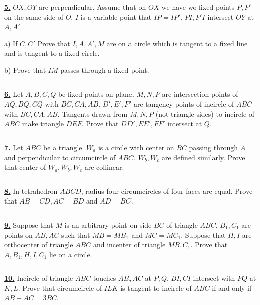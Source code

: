 \documentclass{article}
\newcommand{\equal}{=}
\begin{document}
$$ $$

$$ $$

\href{http://www.artofproblemsolving.com/Forum/viewtopic.php?p=1385942#p1385942}{\bf 5.} $ OX,OY$ are perpendicular. Assume that on $ OX$  we have wo fixed points $ P,P'$ on the same side of $ O$. $ I$ is a variable point that $ IP\equal{}IP'$. $ PI,P'I$ intersect $ OY$ at $ A,A'$.

\par a) If $ C,C'$ Prove that $ I,A,A',M$ are on a circle which is tangent to a fixed line and is tangent to a fixed circle.


\par b) Prove that $ IM$ passes through a fixed point.

$$ $$

\href{http://www.artofproblemsolving.com/Forum/viewtopic.php?p=1385932#p1385932}{\bf 6.} Let $ A,B,C,Q$ be fixed points on plane. $ M,N,P$ are intersection points of $ AQ,BQ,CQ$ with $ BC,CA,AB$. $ D',E',F'$ are tangency points of incircle of $ ABC$ with $ BC,CA,AB$. Tangents drawn from $ M,N,P$ (not triangle sides) to incircle of $ ABC$ make triangle $ DEF$. Prove that $ DD',EE',FF'$ intersect at $ Q$.

$$ $$

\href{http://www.artofproblemsolving.com/Forum/viewtopic.php?p=1385593#p1385593}{\bf 7.} Let $ ABC$ be a triangle. $ W_a$ is a circle with center on $ BC$ passing through $ A$ and perpendicular to circumcircle of $ ABC$. $ W_b,W_c$ are defined similarly. Prove that center of $ W_a,W_b,W_c$ are collinear.

$$ $$

\href{http://www.artofproblemsolving.com/Forum/viewtopic.php?p=1385555#p1385555}{\bf 8.} In tetrahedron $ABCD$, radius four circumcircles of four faces are equal. Prove that $AB=CD, AC=BD$ and $AD=BC.$

$$ $$

\href{http://www.artofproblemsolving.com/Forum/viewtopic.php?p=1385585#p1385585}{\bf 9.} Suppose that $ M$ is an arbitrary point on side $ BC$ of triangle $ ABC$. $ B_1,C_1$ are points on $ AB,AC$ such that $ MB = MB_1$ and $ MC = MC_1$.  Suppose that $ H,I$ are orthocenter of triangle $ ABC$ and incenter of triangle $ MB_1C_1$. Prove that $ A,B_1,H,I,C_1$ lie on a circle.

$$ $$

\href{http://www.artofproblemsolving.com/Forum/viewtopic.php?p=1370723#p1370723}{\bf 10.} Incircle of triangle $ ABC$ touches $ AB,AC$ at $ P,Q$. $ BI, CI$ intersect with $ PQ$ at $ K,L$. Prove that circumcircle of $ ILK$ is tangent to incircle of $ ABC$ if and only if $ AB+AC=3BC$.
\end{document}
